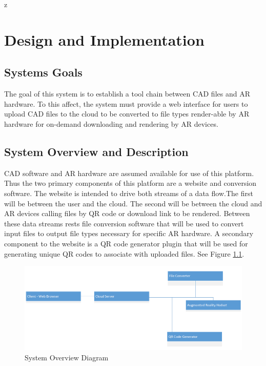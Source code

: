 z

\chapter{Design  and Implementation}

\section{Systems Goals}
The goal of this system is to establish a tool chain between CAD files and AR hardware. To this affect, the system must provide a web interface for users to upload CAD files to the cloud to be converted to file types render-able by AR hardware for on-demand downloading and rendering by AR devices.  

\section{System Overview and Description}
CAD software and AR hardware are assumed available for use of this platform. Thus the two primary components of this platform are a website and conversion software. The website is intended to drive both streams of a data flow.The first will be between the user and the cloud. The second will be between the cloud and AR devices calling files by QR code or download link to be rendered.  Between these data streams rests file conversion software that will be used to convert input files to output file types necessary for specific AR hardware. A secondary component to the website is a QR code generator plugin that will be used for generating unique QR codes to associate with uploaded files. See Figure \ref{UMLSystemOverview}.

\begin{figure}[H]
	\centering
	\includegraphics[width=\textwidth]{UMLSystemOverview.png}
	\caption{System Overview Diagram} 
	\label{UMLSystemOverview}	
\end{figure}

